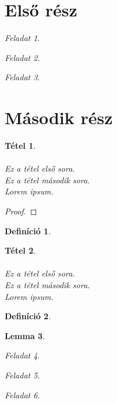\documentclass{article}
\theoremstyle{plain}
\newtheorem{tetel}{Tétel} %
\newtheorem{lemm}[tetel]{Lemma} %
\theoremstyle{definition}
\newtheorem{defe}{Definíció} %
\theoremstyle{remark}
\newtheorem{fel}{Feladat}[section] %
\begin{document}
\listofalgorithms
\section{Első rész}
\begin{fel}

\end{fel}
%
\begin{fel}

\end{fel}
%
\begin{fel}

\end{fel}
\section{Második rész}
\begin{tetel}
\hphantom\\\\
Ez a tétel első sora. \\
Ez a tétel második sora. \verb|| \\
Lorem ipsum.
\end{tetel}
\begin{proof}

\end{proof}
\begin{defe}

\end{defe}
\begin{tetel}
\hphantom\\\\
Ez a tétel első sora. \verb|| \\ 
Ez a tétel második sora. \\
Lorem ipsum.
\end{tetel}
\begin{defe}

\end{defe}
\begin{lemm}

\end{lemm}
\begin{fel}

\end{fel}
\begin{fel}

\end{fel}
\begin{fel}

\end{fel}
\end{document}
